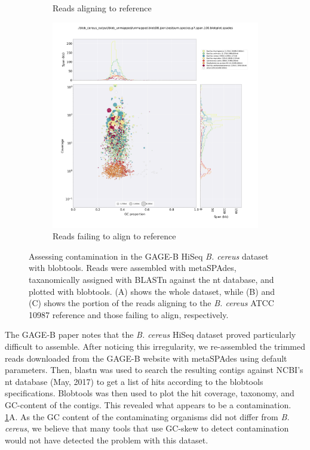 \documentclass[10pt]{article}
\begin{document}
\begin{figure}[H]
\begin{subfigure}[b]{.5\textwidth}
    \caption{Reads aligning to reference}
  \end{subfigure}
  \begin{subfigure}[b]{.5\textwidth}
    \includegraphics[width=.95\textwidth]{unmapped.blobDB.json.bestsum.species.p7.span.100.blobplot.spades.png}
    \caption{Reads failing to align to reference}
  \end{subfigure}
  \caption{Assessing contamination in the GAGE-B HiSeq \textit{B. cereus} dataset with blobtools. Reads were assembled with metaSPAdes, taxanomically assigned with BLASTn against the nt database, and plotted with blobtools.  (A) shows the whole dataset, while (B) and (C) shows the portion of the reads aligning to the \textit{B. cereus} ATCC 10987 reference and those failing to align, respectively.}
  \label{fig:contamination_all}
\end{figure}

The GAGE-B paper \cite{Magoc2013} notes that the \textit{B. cereus} HiSeq dataset proved particularly difficult to assemble. After noticing this irregularity, we re-assembled the trimmed reads downloaded from the GAGE-B website with metaSPAdes\cite{Nurk2017}  using default parameters.  Then, blastn was used to search the resulting contigs against NCBI's nt database (May, 2017) to get a list of hits according to the blobtools \cite{Laetsch2017a} specifications. Blobtools was then used to plot the hit coverage, taxonomy, and GC-content of the contigs.  This revealed what appears to be a contamination. \ref{fig:contamination_all}A. As the GC content of the contaminating organisms did not differ from \textit{B. cereus}, we believe that many tools that use GC-skew to detect contamination would not have detected the problem with this dataset.
\end{document}
